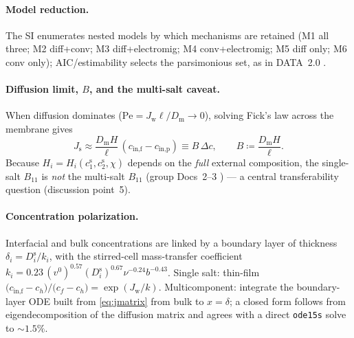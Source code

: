 \documentclass[11pt]{article}
\newcommand{\cs}[1]{{c^{\mathrm{s}}_{#1}}}
\newcommand{\Jw}{J_{\mathrm{w}}}
\newcommand{\Js}{J_{\mathrm{s}}}
\newcommand{\Dm}{D_{\mathrm{m}}}
\begin{document}
\paragraph{Model reduction.}\label{sec:reduction} The SI \cite{siDocx} enumerates
nested models by which mechanisms are retained (M1 all three; M2 diff+conv; M3
diff+electromig; M4 conv+electromig; M5 diff only; M6 conv only); AIC/estimability
selects the parsimonious set, as in DATA~2.0 \cite{liu2025data2}.

\paragraph{Diffusion limit, $B$, and the multi-salt caveat.}\label{sec:Bcaveat}
When diffusion dominates ($\mathrm{Pe}=\Jw\ell/\Dm\to0$), solving Fick's law across
the membrane gives
\begin{equation}
  \Js \approx \frac{\Dm H}{\ell}\,(c_{\text{in,f}}-c_{\text{in,p}}) \equiv B\,\Delta c,
  \qquad B \coloneqq \frac{\Dm H}{\ell}.
  \label{eq:Bdef}
\end{equation}
Because $H_i=H_i(\cs{1},\cs{2},\chi)$ depends on the \emph{full} external
composition, the single-salt $B_{11}$ is \emph{not} the multi-salt $B_{11}$
(group Docs~2--3 \cite{donnanThermoDoc,transportDoc}) --- a central
transferability question (discussion point~5).

\paragraph{Concentration polarization.}\label{sec:cp} Interfacial and bulk
concentrations are linked by a boundary layer of thickness $\delta_i=D^{\mathrm
s}_i/k_i$, with the stirred-cell mass-transfer coefficient
$k_i = 0.23\,(v^0)^{0.57}(D^{\mathrm s}_i)^{0.67}\nu^{-0.24}b^{-0.43}$.
Single salt: thin-film $\big(c_{\text{in,f}}-c_h\big)/\big(c_f-c_h\big)=\exp(\Jw/k)$.
Multicomponent: integrate the boundary-layer ODE built from \eqref{eq:jmatrix}
from bulk to $x=\delta$; a closed form follows from eigendecomposition of the
diffusion matrix and agrees with a direct \texttt{ode15s} solve to $\sim1.5\%$.
\end{document}

